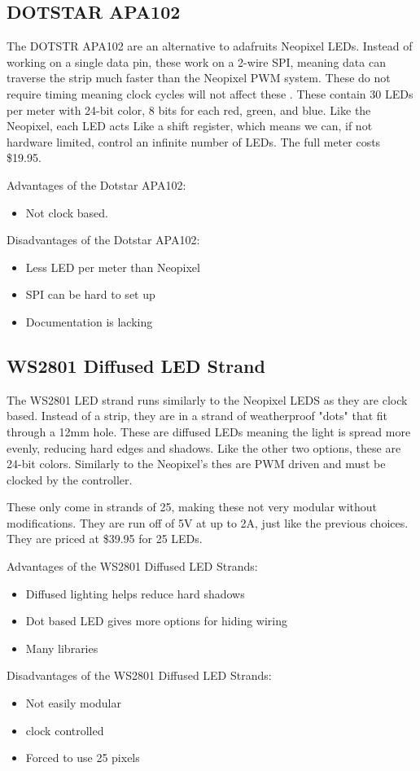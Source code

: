 \documentclass[onecolumn, draftclsnofoot,10pt, compsoc]{IEEEtran}
\begin{document}
		\subsection{DOTSTAR APA102}
		\noindent The DOTSTR APA102 are an alternative to adafruits Neopixel LEDs. Instead
		of working on a single data pin, these work on a 2-wire SPI, meaning data
		can traverse the strip much faster than the Neopixel PWM system. These do
		not require timing meaning clock cycles will not affect these
		\cite[Pg2]{dotstar}. These contain 30 LEDs per meter with 24-bit color,
		8 bits for each red, green, and blue. Like the Neopixel, each LED acts Like
		a shift register, which means we can, if not hardware limited, control an
		infinite number of LEDs. The full meter costs \$19.95.

		\vspace{5mm}
		\noindent Advantages of the Dotstar APA102:
		\begin{itemize}
			\item Not clock based.
		\end{itemize}
		Disadvantages of the Dotstar APA102:
		\begin{itemize}
			\item Less LED per meter than Neopixel
			\item SPI can be hard to set up
			\item Documentation is lacking
		\end{itemize}
		\subsection{WS2801 Diffused LED Strand}
		\noindent The WS2801 LED strand runs similarly to the Neopixel LEDS as they
		are clock based. Instead of a strip, they are in a strand of weatherproof
		"dots" that fit through a 12mm hole\cite[Pg 2]{strand}. These are diffused
		LEDs meaning the light is spread more evenly, reducing hard edges and
		shadows. Like the other two options, these are 24-bit colors. Similarly to
		the Neopixel's thes are PWM driven and must be clocked by the controller.

		\vspace{5mm}
		\noindent These only come in strands of 25, making these not very modular without
		modifications. They are run off of 5V at up to 2A, just like the previous
		choices. They are priced at \$39.95 for 25 LEDs.

		\vspace{5mm}
		\noindent Advantages of the WS2801 Diffused LED Strands:
		\begin{itemize}
			\item Diffused lighting helps reduce hard shadows
			\item Dot based LED gives more options for hiding wiring
			\item Many libraries
		\end{itemize}
		Disadvantages of the WS2801 Diffused LED Strands:
		\begin{itemize}
			\item Not easily modular
			\item clock controlled
			\item Forced to use 25 pixels
		\end{itemize}
\end{document}
